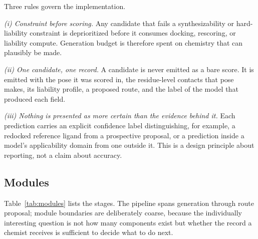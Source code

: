 \documentclass[10pt,twocolumn]{article}
\begin{document}
Three rules govern the implementation.

\emph{(i) Constraint before scoring.} Any candidate that fails a
synthesizability or hard-liability constraint is deprioritized before it
consumes docking, rescoring, or liability compute. Generation budget is
therefore spent on chemistry that can plausibly be made.

\emph{(ii) One candidate, one record.} A candidate is never emitted as a bare
score. It is emitted with the pose it was scored in, the residue-level contacts
that pose makes, its liability profile, a proposed route, and the label of the
model that produced each field.

\emph{(iii) Nothing is presented as more certain than the evidence behind it.}
Each prediction carries an explicit confidence label distinguishing, for
example, a redocked reference ligand from a prospective proposal, or a
prediction inside a model's applicability domain from one outside it. This is
a design principle about reporting, not a claim about accuracy.

\subsection{Modules}

Table~\ref{tab:modules} lists the stages. The pipeline spans generation through
route proposal; module boundaries are deliberately coarse, because the
individually interesting question is not how many components exist but whether
the record a chemist receives is sufficient to decide what to do next.
\end{document}
